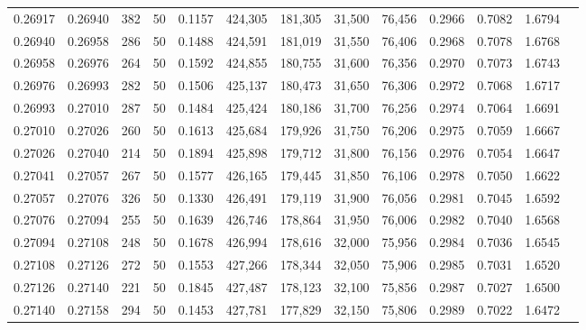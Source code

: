 \begin{tabular}{rrrrrrrrrrrrr}
0.26917 & 0.26940 &   382 &  50 &                                     0.1157 & 424,305 & 181,305 &  31,500 &  76,456 & 0.2966 & 0.7082 & 1.6794 \\
0.26940 & 0.26958 &   286 &  50 &                                     0.1488 & 424,591 & 181,019 &  31,550 &  76,406 & 0.2968 & 0.7078 & 1.6768 \\
0.26958 & 0.26976 &   264 &  50 &                                     0.1592 & 424,855 & 180,755 &  31,600 &  76,356 & 0.2970 & 0.7073 & 1.6743 \\
0.26976 & 0.26993 &   282 &  50 &                                     0.1506 & 425,137 & 180,473 &  31,650 &  76,306 & 0.2972 & 0.7068 & 1.6717 \\
0.26993 & 0.27010 &   287 &  50 &                                     0.1484 & 425,424 & 180,186 &  31,700 &  76,256 & 0.2974 & 0.7064 & 1.6691 \\
0.27010 & 0.27026 &   260 &  50 &                                     0.1613 & 425,684 & 179,926 &  31,750 &  76,206 & 0.2975 & 0.7059 & 1.6667 \\
0.27026 & 0.27040 &   214 &  50 &                                     0.1894 & 425,898 & 179,712 &  31,800 &  76,156 & 0.2976 & 0.7054 & 1.6647 \\
0.27041 & 0.27057 &   267 &  50 &                                     0.1577 & 426,165 & 179,445 &  31,850 &  76,106 & 0.2978 & 0.7050 & 1.6622 \\
0.27057 & 0.27076 &   326 &  50 &                                     0.1330 & 426,491 & 179,119 &  31,900 &  76,056 & 0.2981 & 0.7045 & 1.6592 \\
0.27076 & 0.27094 &   255 &  50 &                                     0.1639 & 426,746 & 178,864 &  31,950 &  76,006 & 0.2982 & 0.7040 & 1.6568 \\
0.27094 & 0.27108 &   248 &  50 &                                     0.1678 & 426,994 & 178,616 &  32,000 &  75,956 & 0.2984 & 0.7036 & 1.6545 \\
0.27108 & 0.27126 &   272 &  50 &                                     0.1553 & 427,266 & 178,344 &  32,050 &  75,906 & 0.2985 & 0.7031 & 1.6520 \\
0.27126 & 0.27140 &   221 &  50 &                                     0.1845 & 427,487 & 178,123 &  32,100 &  75,856 & 0.2987 & 0.7027 & 1.6500 \\
0.27140 & 0.27158 &   294 &  50 &                                     0.1453 & 427,781 & 177,829 &  32,150 &  75,806 & 0.2989 & 0.7022 & 1.6472 \\

\end{tabular}
